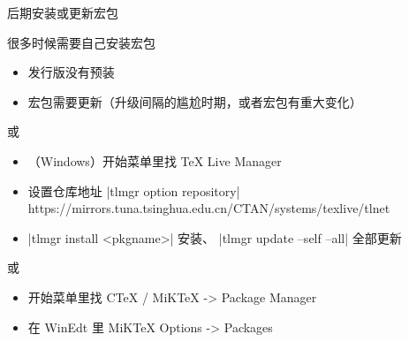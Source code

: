 \begin{frame}[fragile]{后期安装或更新宏包}
  \begin{exampleblock}{很多时候需要自己安装宏包}
    \begin{itemize}
      \item 发行版没有预装
      \item 宏包需要更新（\TL 升级间隔的尴尬时期，或者宏包有重大变化）
    \end{itemize}
  \end{exampleblock}
  \begin{exampleblock}{\TL 或 \MacTeX}
    \begin{itemize}
      \item （Windows）开始菜单里找 TeX Live Manager
      \item 设置仓库地址 |tlmgr option repository| {\footnotesize\ttfamily
        https://mirrors.tuna.tsinghua.edu.cn/CTAN/systems/texlive/tlnet}
      \item |tlmgr install <pkgname>| 安装、 |tlmgr update --self --all| 全部更新
    \end{itemize}
  \end{exampleblock}
  \begin{exampleblock}{\CTeX 或 \MiKTeX}
    \begin{itemize}
      \item 开始菜单里找 CTeX / MiKTeX -> Package Manager
      \item 在 WinEdt 里 MiKTeX Options -> Packages
    \end{itemize}
  \end{exampleblock}
\end{frame}




